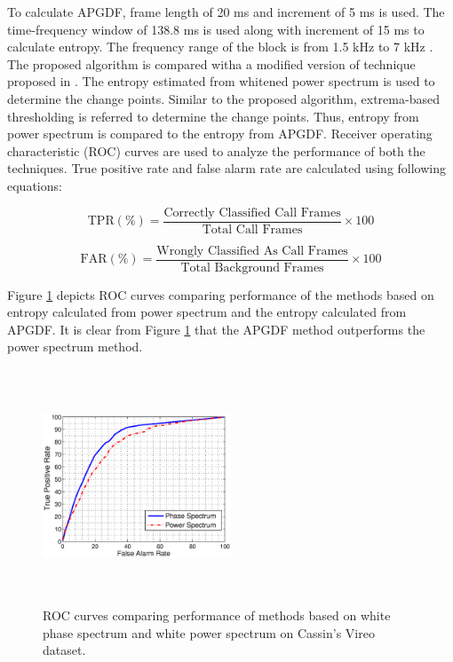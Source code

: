 \documentclass[a4paper]{article}
\begin{document}
To calculate APGDF, frame length of 20 ms and increment of  
5 ms is used. The time-frequency window of 138.8 ms is used along with increment of 15 ms to calculate entropy. The frequency range of the block is from 1.5 kHz to 7 kHz \cite{wang2013}. The proposed algorithm is compared witha a modified version of technique proposed in \cite{wang2013}. The entropy estimated from whitened power spectrum is used to determine the change points. Similar to the proposed algorithm, extrema-based thresholding is referred to determine the change points. Thus, entropy from power spectrum is compared to the entropy from APGDF. Receiver operating characteristic (ROC) curves are used to analyze the performance of both the techniques. True positive rate and false alarm rate are calculated using following equations:

\begin{equation}
\text{TPR} (\%)=\frac{\text{Correctly Classified Call Frames}} {\text{Total Call Frames}} \times 100 
\end{equation}




\begin{equation}
\text{FAR} (\%)=\frac{\text{Wrongly Classified As Call Frames}} {\text{Total Background Frames}} \times 100 
\end{equation}



 Figure \ref{fig:ROCdata1} depicts ROC curves comparing performance of the methods based on entropy calculated from power spectrum and the entropy calculated from APGDF. It is clear from  Figure \ref{fig:ROCdata1} that the APGDF method outperforms the power spectrum method.

\begin{figure}[h]
\centering
\includegraphics[width=0.5\textwidth,height=7cm]{gd_1.eps}
\caption{ROC  curves  comparing  performance  of  methods based on white phase spectrum and white power spectrum on Cassin's Vireo dataset.}
\label{fig:ROCdata1}
\end{figure}
\end{document}
